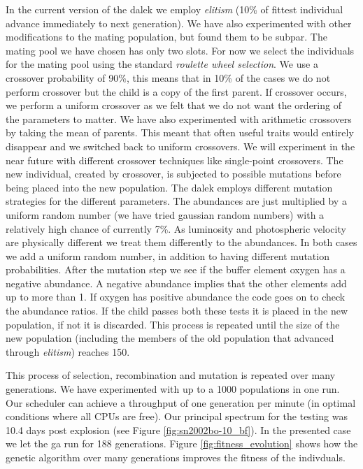 In the current version of the \gls{dalek} we employ \textit{elitism} (10\% of fittest individual advance immediately to next generation). We have also experimented with other modifications to the mating population, but found them to be subpar. The mating pool we have chosen has only two slots. For now we select the individuals for the mating pool using the standard \textit{roulette wheel selection}. We use a crossover probability of 90\%, this means that in 10\% of the cases we do not perform crossover but the child is a copy of the first parent. If crossover occurs, we perform a uniform crossover as we felt that we do not want the ordering of the parameters to matter. We have also experimented with arithmetic crossovers by taking the mean of parents. This meant that often useful traits would entirely disappear and we switched back to uniform crossovers. We will experiment in the near future with different crossover techniques like single-point crossovers. The new individual, created by crossover, is subjected to possible mutations before being placed into the new population. The \gls{dalek} employs different mutation strategies for the different parameters. The abundances are just multiplied by a uniform random number (we have tried gaussian random numbers) with a relatively high chance of currently 7\%. As luminosity and photospheric velocity are physically different we treat them differently to the abundances. In both cases we add a uniform random number, in addition to having different mutation probabilities. After the mutation step we see if the buffer element oxygen has a negative abundance. A negative abundance implies that the other elements add up to more than 1. If oxygen has positive abundance the code goes on to check the abundance ratios. If the child passes both these tests it is placed in the new population, if not it is discarded. This process is repeated until the size of the new population (including the members of the old population that advanced through \textit{elitism}) reaches 150.

This process of selection, recombination and mutation is repeated over many generations. We have experimented with up to a 1000 populations in one run. Our scheduler can achieve a throughput of one generation per minute (in optimal conditions where all CPUs are free). 
Our principal spectrum for the testing was  10.4 days post explosion (see Figure \ref{fig:sn2002bo-10_bf}). 
In the presented case we let the \gls{ga} run for 188 generations. Figure \ref{fig:fitness_evolution} shows how the genetic algorithm over many generations improves the fitness of the indivduals. 

